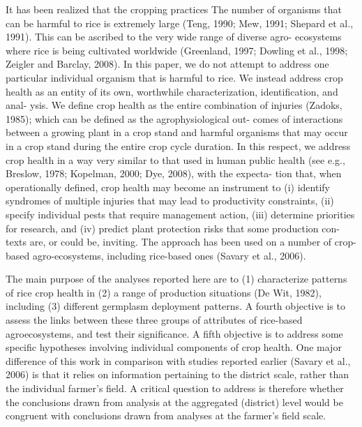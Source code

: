 \documentclass{frontiersSCNS} %
\begin{document}
It has been realized that the cropping practices The number of organisms that can be harmful to rice is extremely large (Teng, 1990; Mew, 1991; Shepard et al., 1991). This can be ascribed to the very wide range of diverse agro- ecosystems where rice is being cultivated worldwide (Greenland, 1997; Dowling et al., 1998; Zeigler and Barclay, 2008). In this paper, we do not attempt to address one particular individual organism that is harmful to rice. We instead address crop health as an entity of its own, worthwhile characterization, identification, and anal- ysis. We define crop health as the entire combination of injuries (Zadoks, 1985); which can be defined as the agrophysiological out- comes of interactions between a growing plant in a crop stand and harmful organisms that may occur in a crop stand during the entire crop cycle duration. In this respect, we address crop health in a way very similar to that used in human public health (see e.g., Breslow, 1978; Kopelman, 2000; Dye, 2008), with the expecta- tion that, when operationally defined, crop health may become an instrument to (i) identify syndromes of multiple injuries that may lead to productivity constraints, (ii) specify individual pests that require management action, (iii) determine priorities for research, and (iv) predict plant protection risks that some production con- texts are, or could be, inviting. The approach has been used on a number of crop-based agro-ecosystems, including rice-based ones (Savary et al., 2006).



The main purpose of the analyses reported here are to (1) characterize patterns of rice crop health in (2) a range of production situations (De Wit, 1982), including (3) different germplasm deployment patterns. A fourth objective is to assess the links between these three groups of attributes of rice-based agroecosystems, and test their significance. A fifth objective is to address some specific hypotheses involving individual components of crop health. One major difference of this work in comparison with studies reported earlier (Savary et al., 2006) is that it relies on information pertaining to the district scale, rather than the individual farmer’s field. A critical question to address is therefore whether the conclusions drawn from analysis at the aggregated (district) level would be congruent with conclusions drawn from analyses at the farmer’s field scale.
\end{document}
